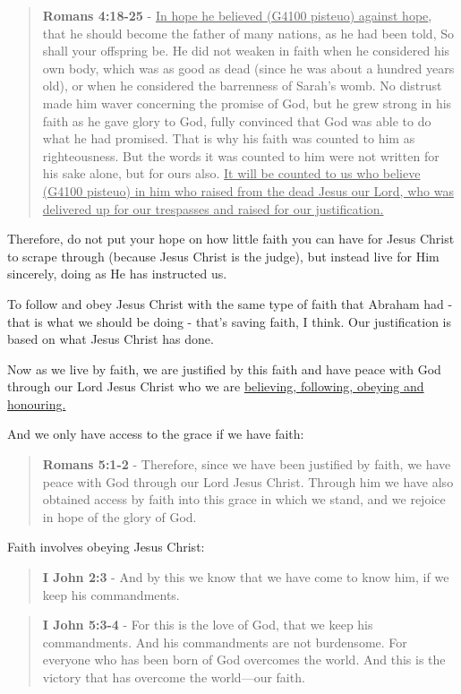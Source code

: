 \documentclass[11pt]{article}
\begin{document}
\begin{quote}
\textbf{Romans 4:18-25} - \uline{In hope he believed (G4100 pisteuo) against hope}, that he should become the father of many nations, as he had been told, So shall your offspring be. He did not weaken in faith when he considered his own body, which was as good as dead (since he was about a hundred years old), or when he considered the barrenness of Sarah's womb. No distrust made him waver concerning the promise of God, but he grew strong in his faith as he gave glory to God, fully convinced that God was able to do what he had promised. That is why his faith was counted to him as righteousness. But the words it was counted to him were not written for his sake alone, but for ours also. \uline{It will be counted to us who believe (G4100 pisteuo) in him who raised from the dead Jesus our Lord, who was delivered up for our trespasses and raised for our justification.}
\end{quote}

Therefore, do not put your hope on how little faith you can have for Jesus Christ to scrape through (because Jesus Christ is the judge), but instead live for Him sincerely, doing as He has instructed us.

To follow and obey Jesus Christ with the same type of faith that Abraham had - that is what we should be doing - that's saving faith, I think. Our justification is based on what Jesus Christ has done.

Now as we live by faith, we are justified by this faith and have peace with God through our Lord Jesus Christ who we are \uline{believing, following, obeying and honouring.}

And we only have access to the grace if we have faith:

\begin{quote}
\textbf{Romans 5:1-2} - Therefore, since we have been justified by faith, we have peace with God through our Lord Jesus Christ. Through him we have also obtained access by faith into this grace in which we stand, and we rejoice in hope of the glory of God.
\end{quote}

Faith involves obeying Jesus Christ:

\begin{quote}
\textbf{I John 2:3} - And by this we know that we have come to know him, if we keep his commandments.
\end{quote}

\begin{quote}
\textbf{I John 5:3-4} - For this is the love of God, that we keep his commandments. And his commandments are not burdensome. For everyone who has been born of God overcomes the world. And this is the victory that has overcome the world—our faith.
\end{quote}
\end{document}
